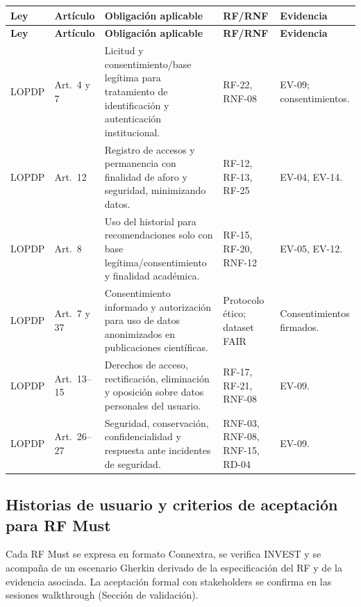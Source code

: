 \documentclass[12pt,journal,onecolumn]{IEEEtran}
\begin{document}
\begin{longtable}{P{0.14\textwidth}P{0.12\textwidth}P{0.30\textwidth}P{0.18\textwidth}P{0.18\textwidth}}\toprule
\textbf{Ley} & \textbf{Artículo} & \textbf{Obligación aplicable} & \textbf{RF/RNF} & \textbf{Evidencia}\\\midrule\endfirsthead
\toprule\textbf{Ley} & \textbf{Artículo} & \textbf{Obligación aplicable} & \textbf{RF/RNF} & \textbf{Evidencia}\\\midrule\endhead
LOPDP & Art.~4 y 7 & Licitud y consentimiento/base legítima para tratamiento de identificación y autenticación institucional. & RF-22, RNF-08 & EV-09; consentimientos.\\
LOPDP & Art.~12 & Registro de accesos y permanencia con finalidad de aforo y seguridad, minimizando datos. & RF-12, RF-13, RF-25 & EV-04, EV-14.\\
LOPDP & Art.~8 & Uso del historial para recomendaciones solo con base legítima/consentimiento y finalidad académica. & RF-15, RF-20, RNF-12 & EV-05, EV-12.\\
LOPDP & Art.~7 y 37 & Consentimiento informado y autorización para uso de datos anonimizados en publicaciones científicas. & Protocolo ético; dataset FAIR & Consentimientos firmados.\\
LOPDP & Art.~13--15 & Derechos de acceso, rectificación, eliminación y oposición sobre datos personales del usuario. & RF-17, RF-21, RNF-08 & EV-09.\\
LOPDP & Art.~26--27 & Seguridad, conservación, confidencialidad y respuesta ante incidentes de seguridad. & RNF-03, RNF-08, RNF-15, RD-04 & EV-09.\\\bottomrule
\end{longtable}

\subsection{Historias de usuario y criterios de aceptación para RF Must}
Cada RF Must se expresa en formato Connextra, se verifica INVEST y se acompaña de un escenario Gherkin derivado de la especificación del RF y de la evidencia asociada. La aceptación formal con stakeholders se confirma en las sesiones walkthrough (Sección de validación).
\end{document}
